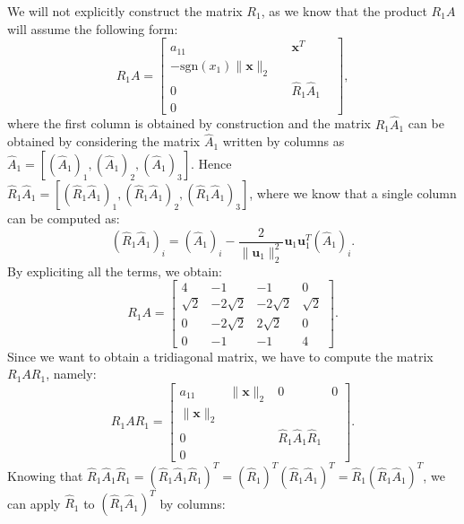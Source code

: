 \documentclass[a4paper,11pt]{article}
\begin{document}
We will not explicitly construct the matrix $R_1$, as we know that the product $R_1 A$ will assume the following form:
\begin{equation}\label{key}
	R_1 A= \left[ 
	\begin{array}{c|ccc}
		a_{11} &  & \textbf{x}^T  &  \\
		\hline
		-\text{sgn}(x_1) \lVert \textbf{x}\rVert_2  &  &  &  \\
		0 &  & \hat{R}_1 \hat{A}_1 &  \\
		0 &  &  & 
	\end{array}\right] ,
\end{equation}
where the first column is obtained by construction and the matrix $\hat{R}_1\hat{A}_1$ can be obtained by considering the matrix $\hat{A}_1$ written by columns as $\hat{A}_1 = \left[ ( \hat{A}_1)_1,( \hat{A}_1)_2,( \hat{A}_1)_3 \right] $. Hence $\hat{R}_1\hat{A}_1 = \left[ ( \hat{R}_1\hat{A}_1)_1,( \hat{R}_1\hat{A}_1)_2,(\hat{R}_1 \hat{A}_1)_3 \right] $, where we know that a single column can be computed as:
\begin{equation}\label{key}
	( \hat{R}_1\hat{A}_1)_i = (\hat{A}_1)_i - \frac{2}{\lVert \textbf{u}_1\rVert_2^2} \textbf{u}_1 \textbf{u}_1^T(\hat{A}_1)_i .
\end{equation}
By expliciting all the terms, we obtain:
\begin{equation}\label{key}
	R_1 A = \begin{bmatrix}
		4 & -1 & -1 & 0 \\
		\sqrt{2} & -2\sqrt{2} & -2\sqrt{2} & \sqrt{2} \\
		0 & -2\sqrt{2} & 2\sqrt{2} & 0 \\
		0 & -1 & -1 & 4
	\end{bmatrix}.
\end{equation}
Since we want to obtain a tridiagonal matrix, we have to compute the matrix $R_1 A R_1$, namely:
\begin{equation}\label{key}
	R_1 A R_1 = \left[ 
	\begin{array}{c|ccc}
		a_{11} &  \lVert \textbf{x}\rVert_2 &  0 & 0 \\
		\hline
		 \lVert \textbf{x}\rVert_2  &  &  &  \\
		0 &  & \hat{R}_1 \hat{A}_1 \hat{R}_1  &  \\
		0 &  &  & 
	\end{array}\right].
\end{equation}
 Knowing that $\hat{R}_1 \hat{A}_1 \hat{R}_1 = (\hat{R}_1 \hat{A}_1 \hat{R}_1)^T = (\hat{R}_1)^T (\hat{R}_1 \hat{A}_1 )^T =\hat{R}_1 (\hat{R}_1 \hat{A}_1 )^T$, we can apply $\hat{R}_1$ to $(\hat{R}_1 \hat{A}_1 )^T$ by columns:
\end{document}
